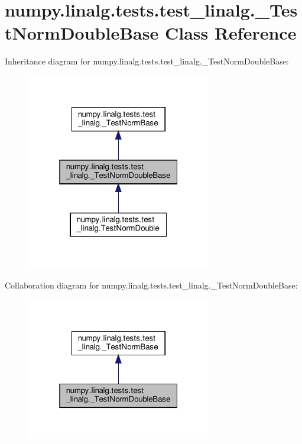 \hypertarget{classnumpy_1_1linalg_1_1tests_1_1test__linalg_1_1__TestNormDoubleBase}{}\section{numpy.\+linalg.\+tests.\+test\+\_\+linalg.\+\_\+\+Test\+Norm\+Double\+Base Class Reference}
\label{classnumpy_1_1linalg_1_1tests_1_1test__linalg_1_1__TestNormDoubleBase}


Inheritance diagram for numpy.\+linalg.\+tests.\+test\+\_\+linalg.\+\_\+\+Test\+Norm\+Double\+Base\+:
\nopagebreak
\begin{figure}[H]
\begin{center}
\leavevmode
\includegraphics[width=229pt]{classnumpy_1_1linalg_1_1tests_1_1test__linalg_1_1__TestNormDoubleBase__inherit__graph}
\end{center}
\end{figure}


Collaboration diagram for numpy.\+linalg.\+tests.\+test\+\_\+linalg.\+\_\+\+Test\+Norm\+Double\+Base\+:
\nopagebreak
\begin{figure}[H]
\begin{center}
\leavevmode
\includegraphics[width=229pt]{classnumpy_1_1linalg_1_1tests_1_1test__linalg_1_1__TestNormDoubleBase__coll__graph}
\end{center}
\end{figure}
